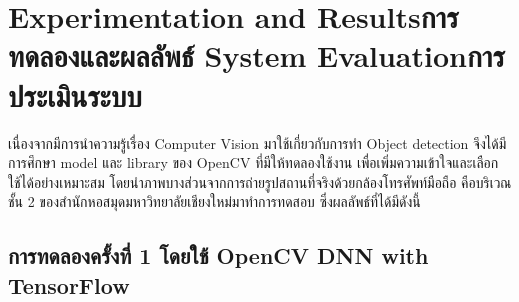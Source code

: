 \chapter{\ifproject%
\ifenglish Experimentation and Results\else การทดลองและผลลัพธ์\fi
\else%
\ifenglish System Evaluation\else การประเมินระบบ\fi
\fi}

เนื่องจากมีการนำความรู้เรื่อง Computer Vision มาใช้เกี่ยวกับการทำ Object detection จึงได้มีการศึกษา model และ library
ของ OpenCV ที่มีให้ทดลองใช้งาน เพื่อเพิ่มความเข้าใจและเลือกใช้ได้อย่างเหมาะสม โดยนำภาพบางส่วนจากการถ่ายรูปสถานที่จริงด้วยกล้องโทรศัพท์มือถือ คือบริเวณชั้น 2
ของสำนักหอสมุดมหาวิทยาลัยเชียงใหม่มาทำการทดสอบ ซึ่งผลลัพธ์ที่ได้มีดังนี้


\section{การทดลองครั้งที่ 1 โดยใช้ OpenCV DNN with TensorFlow}

